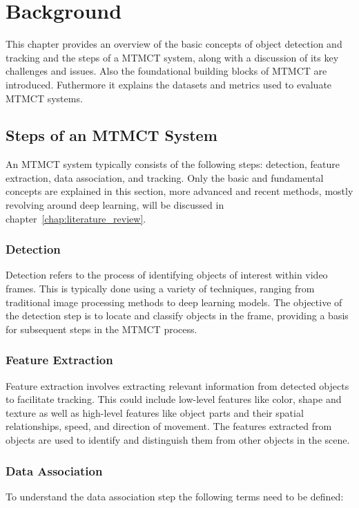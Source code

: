 \chapter{Background}\label{chap:background}
This chapter provides an overview of the basic concepts of object detection and tracking and the steps of a MTMCT system, along with a discussion of its key challenges and issues. Also the foundational building blocks of MTMCT are introduced. Futhermore it explains the datasets and metrics used to evaluate MTMCT systems.

\section{Steps of an MTMCT System}\label{sec:steps_of_an_mtmct_system}
An MTMCT system typically consists of the following steps: detection, feature extraction, data association, and tracking. Only the basic and fundamental concepts are explained in this section, more advanced and recent methods, mostly revolving around deep learning, will be discussed in chapter~\ref{chap:literature_review}.

\subsection{Detection}\label{subsec:detection}
Detection refers to the process of identifying objects of interest within video frames. This is typically done using a variety of techniques, ranging from traditional image processing methods to deep learning models. The objective of the detection step is to locate and classify objects in the frame, providing a basis for subsequent steps in the MTMCT process.

\subsection{Feature Extraction}\label{subsec:feature_extraction}
Feature extraction involves extracting relevant information from detected objects to facilitate tracking. This could include low-level features like color, shape and texture as well as high-level features like object parts and their spatial relationships, speed, and direction of movement. The features extracted from objects are used to identify and distinguish them from other objects in the scene.

\subsection{Data Association}\label{subsec:data_association}
To understand the data association step the following terms need to be defined:

